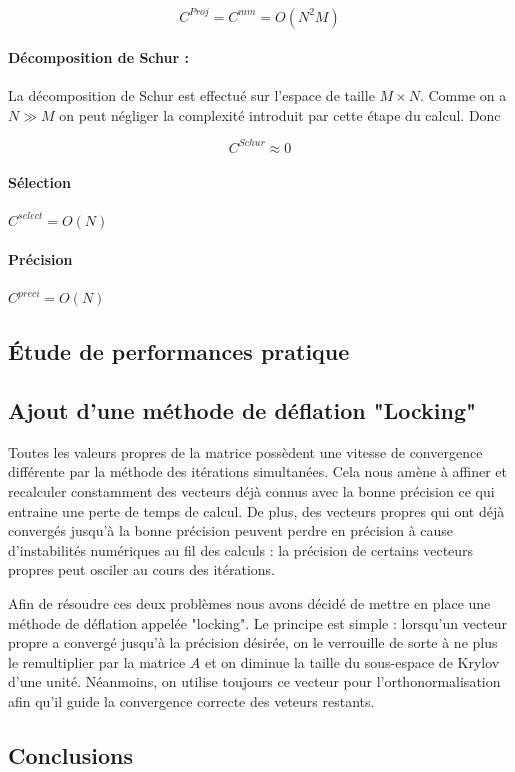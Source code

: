 \documentclass[11pt,a4paper]{article}
\begin{document}
			$$C^{Proj} = C^{mm} = O(N^2M)$$

			\paragraph{Décomposition de Schur :} La décomposition de Schur est effectué sur l'espace de taille $M \times N$. Comme on a $N \gg M$ on peut négliger la complexité introduit par cette étape du calcul. Donc

			$$C^{Schur} \approx 0$$

			\paragraph{Sélection} $C^{select} = O(N)$
			\paragraph{Précision} $C^{preci} = O(N)$


	\subsection{Étude de performances pratique}



	\subsection{Ajout d'une méthode de déflation "Locking"}
		Toutes les valeurs propres de la matrice possèdent une vitesse de convergence différente par la méthode des itérations simultanées. Cela nous amène à affiner et recalculer constamment des vecteurs déjà connus avec la bonne précision ce qui entraine une perte de temps de calcul. De plus, des vecteurs propres qui ont déjà convergés jusqu'à la bonne précision peuvent perdre en précision à cause d'instabilités numériques au fil des calculs : la précision de certains vecteurs propres peut osciler au cours des itérations.

		Afin de résoudre ces deux problèmes nous avons décidé de mettre en place une méthode de déflation appelée "locking". Le principe est simple : lorsqu'un vecteur propre a convergé jusqu'à la précision désirée, on le verrouille de sorte à ne plus le remultiplier par la matrice $A$ et on diminue la taille du sous-espace de Krylov d'une unité. Néanmoins, on utilise toujours ce vecteur pour l'orthonormalisation afin qu'il guide la convergence correcte des veteurs restants.

	\subsection{Conclusions}
\end{document}
